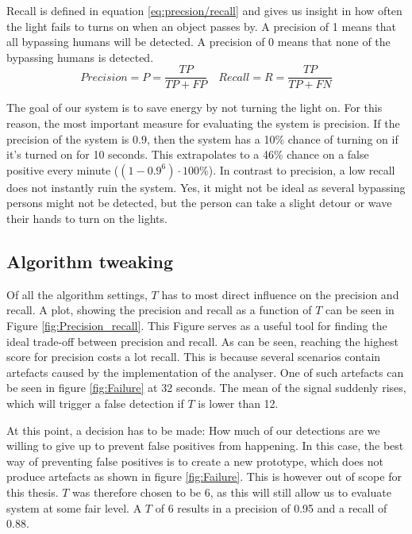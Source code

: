 Recall is defined in equation \ref{eq:precsion/recall} and gives us insight in how often the light fails to turns on when an object passes by. A precision of 1 means that all bypassing humans will be detected. A precision of 0 means that none of the bypassing humans is detected.
\begin{equation}
\label{eq:precsion/recall}
Precision = P = \frac{TP}{TP + FP}
\quad
Recall = R = \frac{TP}{TP + FN}
\end{equation}

The goal of our system is to save energy by not turning the light on. For this reason, the most important measure for evaluating the system is precision. If the precision of the system is 0.9, then the system has a 10\% chance of turning on if it's turned on for 10 seconds. This extrapolates to a 46\% chance on a false positive every minute ($(1-0.9^6)\cdot 100\%$). In contrast to precision, a low recall does not instantly ruin the system. Yes, it might not be ideal as several bypassing persons might not be detected, but the person can take a slight detour or wave their hands to turn on the lights.

\subsection{Algorithm tweaking}
Of all the algorithm settings, $T$ has to most direct influence on the precision and recall. A plot, showing the precision and recall as a function of $T$ can be seen in Figure \ref{fig:Precision_recall}. This Figure serves as a useful tool for finding the ideal trade-off between precision and recall. As can be seen, reaching the highest score for precision costs a lot recall. This is because several scenarios contain artefacts caused by the implementation of the analyser. One of such artefacts can be seen in figure \ref{fig:Failure} at 32 seconds. The mean of the signal suddenly rises, which will trigger a false detection if $T$ is lower than 12. 

At this point, a decision has to be made: How much of our detections are we willing to give up to prevent false positives from happening. In this case, the best way of preventing false positives is to create a new prototype, which does not produce artefacts as shown in figure \ref{fig:Failure}. This is however out of scope for this thesis. $T$ was therefore chosen to be 6, as this will still allow us to evaluate system at some fair level. A $T$ of 6 results in a precision of 0.95 and a recall of 0.88.

